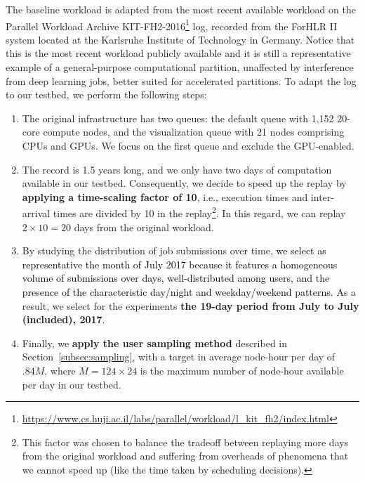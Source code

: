 \documentclass[a4paper,fleqn]{cas-dc}
\newcommand{\mm}[1]{\textcolor{black}{#1}}
\begin{document}
\label{subsec:baseline}
The baseline workload is adapted from the most recent available workload
on the Parallel Workload Archive 
KIT-FH2-2016\footnote{\url{https://www.cs.huji.ac.il/labs/parallel/workload/l_kit_fh2/index.html}} log, recorded from the ForHLR II system located at the Karlsruhe Institute of Technology in Germany. 
Notice that this is the most recent workload publicly available and it is still a representative example of a general-purpose computational partition, unaffected by interference from deep learning jobs, better suited for accelerated partitions.
To adapt the log to our testbed, we perform the following steps:

\begin{enumerate}[wide]
    \item The original infrastructure has two queues: 
    the default queue with 1,152 20-core compute nodes, 
    and the visualization queue with 21 nodes comprising CPUs and GPUs.
    We focus on the first queue and exclude the GPU-enabled.

    \item The record is 1.5 years long, and we only have two days of computation available in our testbed. Consequently, we decide to speed up the replay by \textbf{applying a time-scaling factor of 10}, i.e., execution times and inter-arrival times are divided by 10 in the replay\footnote{This factor was chosen to balance the tradeoff between replaying more days from the original workload and suffering from overheads of phenomena that we cannot speed up (like the time taken by scheduling decisions).}.
    In this regard, we can replay $2\times10=20$ days from the original workload.

    \item 
    By studying the distribution of job submissions over time,
    \mm{
    we select as representative the month of July 2017 because it features
    a homogeneous volume of submissions over days,
    well-distributed among users, and
    the presence of the characteristic day/night and weekday/weekend patterns.}
    As a result, we select for the experiments \textbf{the 19-day period from July  to July  (included), 2017}.

    \item Finally, we \textbf{apply the user sampling method} described in Section~\ref{subsec:sampling}, 
    with a target in average node-hour per day of $.84M$, 
    where $M=124\times24$ is the maximum number of node-hour available per day in our testbed.
\end{enumerate}
\end{document}
